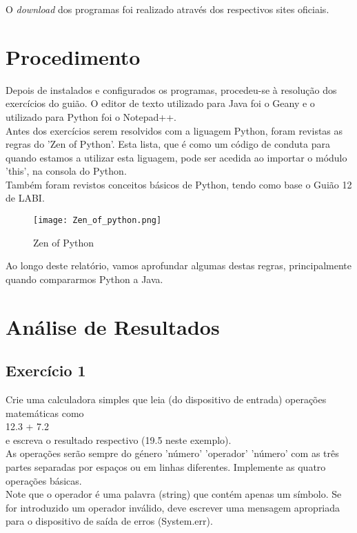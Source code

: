 \documentclass[a4paper]{report}
\begin{document}
O \textit{download} dos programas foi realizado através dos respectivos sites oficiais.

\clearpage

\chapter{Procedimento}
\label{procedimento}

Depois de instalados e configurados os programas, procedeu-se à resolução dos exercícios do guião. O editor de texto utilizado para Java foi o Geany e o utilizado para Python foi o Notepad++.
\\
Antes dos exercícios serem resolvidos com a liguagem Python, foram revistas as regras do 'Zen of Python'. Esta lista, que é como um código de conduta para quando estamos a utilizar esta liguagem, pode ser acedida ao importar o módulo 'this', na consola do Python.
\\
Também foram revistos conceitos básicos de Python, tendo como base o Guião 12\cite{Guide12} de LABI.


\begin{figure}[ht]
 \texttt{[image: Zen\_of\_python.png]}
 \caption{Zen of Python}
 \label{zen}
\end{figure}

Ao longo deste relatório, vamos aprofundar algumas destas regras, principalmente quando compararmos Python a Java.


\chapter{Análise de Resultados}
\label{analise}

\section{Exercício 1}
\label{exercicio1}

Crie uma calculadora simples que leia (do dispositivo de entrada) operações matemáticas como\\
12.3 + 7.2\\
e escreva o resultado respectivo (19.5 neste exemplo).\\
As operações serão sempre do género 'número' 'operador' 'número' com as três partes separadas por espaços ou em linhas diferentes. 
Implemente as quatro operações básicas. 
\\ Note que o operador é uma palavra (string) que contém apenas um símbolo.
Se for introduzido um operador inválido, deve escrever uma
mensagem apropriada para o dispositivo de saída de erros (System.err).
\end{document}
